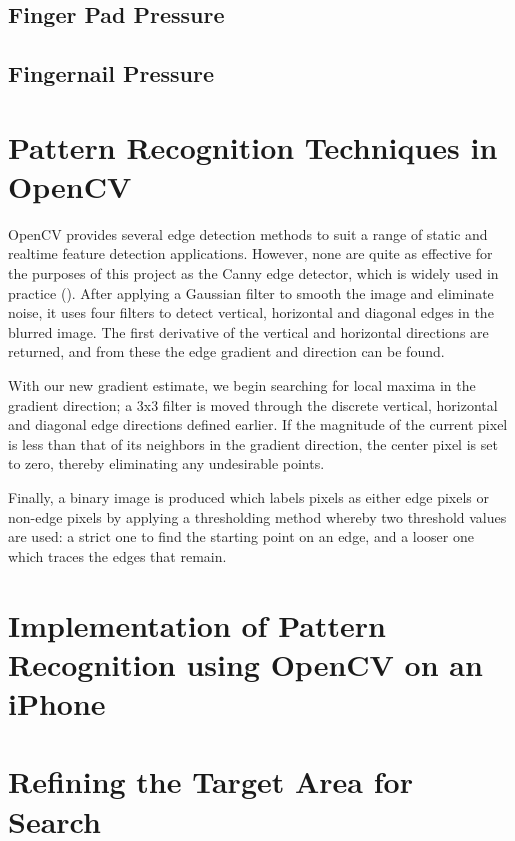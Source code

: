 \subsection{Finger Pad Pressure}\label{sec:FingerPadPressure}



\subsection{Fingernail Pressure}\label{sec:FingernailPressure}

\section{Pattern Recognition Techniques in OpenCV}\label{sec:PaternRecognitionOpenCV}

OpenCV provides several edge detection methods to suit a range of static and realtime feature detection applications. However, none are quite as effective for the purposes of this project as the Canny edge detector, which is widely used in practice (\cite{Ziou1998}). After applying a Gaussian filter to smooth the image and eliminate noise, it uses four filters to detect vertical, horizontal and diagonal edges in the blurred image. The first derivative of the vertical and horizontal directions are returned, and from these the edge gradient and direction can be found.

With our new gradient estimate, we begin searching for local maxima in the gradient direction; a 3x3 filter is moved through the discrete vertical, horizontal and diagonal edge directions defined earlier. If the magnitude of the current pixel is less than that of its neighbors in the gradient direction, the center pixel is set to zero, thereby eliminating any undesirable points.

Finally, a binary image is produced which labels pixels as either edge pixels or non-edge pixels by applying a thresholding method whereby two threshold values are used: a strict one to find the starting point on an edge, and a looser one which traces the edges that remain.

\section{Implementation of Pattern Recognition using OpenCV on an iPhone}\label{sec:ImplementationOnIPhone}

\section{Refining the Target Area for Search}\label{sec:RefiningTargetAreaForSearch}


